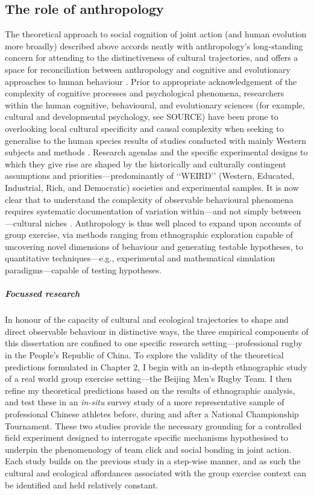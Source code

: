 \begin{CJK}{UTF8}{gbsn}
\subsection{The role of anthropology}
The theoretical approach to social cognition of joint action (and human evolution more broadly) described above accords neatly with anthropology's long-standing concern for attending to the distinctiveness of cultural trajectories, and offers a space for reconciliation between anthropology and cognitive and evolutionary approaches to human behaviour \citep{Whitehouse2012}.  Prior to appropriate acknowledgement of the complexity of cognitive processes and psychological phenomena, researchers within the human cognitive, behavioural, and evolutionary sciences (for example, cultural and developmental psychology, see SOURCE) have been prone to overlooking local cultural specificity and causal complexity when seeking to generalise to the human species results of studies conducted with mainly Western subjects and methods \citep{Henrich2010d}.  Research agendas and the specific experimental designs to which they give rise are shaped by the historically and culturally contingent assumptions and priorities---predominantly of ‘‘WEIRD’’ (Western, Educated, Industrial, Rich, and Democratic) societies and experimental samples.  It is now clear that to understand the complexity of observable behavioural phenomena requires systematic documentation of variation within---and not simply between---cultural niches \citep{Fuentes2016}.  Anthropology is thus well placed to expand upon accounts of group exercise, via methods ranging from ethnographic exploration capable of uncovering novel dimensions of behaviour and generating testable hypotheses, to quantitative techniques---e.g., experimental and mathematical simulation paradigms---capable of testing hypotheses.

\subparagraph{Focussed research}
In honour of the capacity of cultural and ecological trajectories to shape and direct observable behaviour in distinctive ways, the three empirical components of this dissertation are confined to one specific research setting---professional rugby in the People's Republic of China.   To explore the validity of the theoretical predictions formulated in Chapter 2, I begin with an in-depth ethnographic study of a real world group exercise setting---the Beijing Men's Rugby Team.  I then refine my theoretical predictions based on the results of ethnographic analysis, and test these in an \textit{in-situ} survey study of a more representative sample of professional Chinese athletes before, during and after a National Championship Tournament.  These two studies provide the necessary grounding for a controlled field experiment designed to interrogate specific mechanisms hypothesised to underpin the phenomenology of team click and social bonding in joint action.  Each study builds on the previous study in a step-wise manner, and as such the cultural and ecological affordances associated with the group exercise context can be identified and held relatively constant.


\end{CJK}
